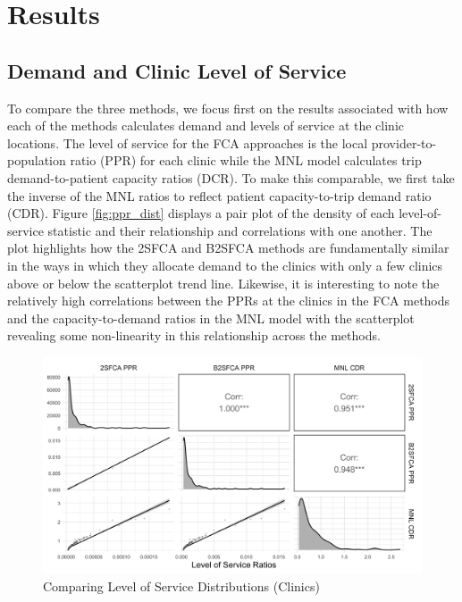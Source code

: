 \documentclass[]{elsarticle} %
\begin{document}
\hypertarget{results}{%
\section{Results}\label{results}}

\hypertarget{demand-and-clinic-level-of-service}{%
\subsection{Demand and Clinic Level of
Service}\label{demand-and-clinic-level-of-service}}

To compare the three methods, we focus first on the results associated
with how each of the methods calculates demand and levels of service at
the clinic locations. The level of service for the FCA approaches is the
local provider-to-population ratio (PPR) for each clinic while the MNL
model calculates trip demand-to-patient capacity ratios (DCR). To make
this comparable, we first take the inverse of the MNL ratios to reflect
patient capacity-to-trip demand ratio (CDR). Figure \ref{fig:ppr_dist}
displays a pair plot of the density of each level-of-service statistic
and their relationship and correlations with one another. The plot
highlights how the 2SFCA and B2SFCA methods are fundamentally similar in
the ways in which they allocate demand to the clinics with only a few
clinics above or below the scatterplot trend line. Likewise, it is
interesting to note the relatively high correlations between the PPRs at
the clinics in the FCA methods and the capacity-to-demand ratios in the
MNL model with the scatterplot revealing some non-linearity in this
relationship across the methods.

\begin{figure}
\includegraphics[width=1\linewidth]{./img/pair_plot_ppr} \caption{\label{fig:ppr_dist}Comparing Level of Service Distributions (Clinics)}\label{fig:fig 2 ppr_dist_fig}
\end{figure}
\end{document}
